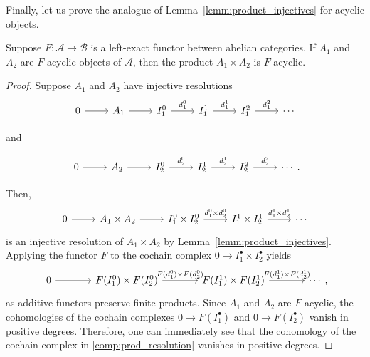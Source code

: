 Finally, let us prove the analogue of Lemma~\ref{lemm:product_injectives}
for acyclic objects.
\begin{lemm}\label{lemm:acyclic_prod}
  Suppose $F:\mathcal{A}\to\mathcal{B}$ is a left-exact functor between
  abelian categories. If $A_{1}$ and $A_{2}$ are $F$-acyclic objects of
  $\mathcal{A}$, then the product $A_{1}\times A_{2}$ is $F$-acyclic.
\end{lemm}
\begin{proof}
  Suppose $A_{1}$ and $A_{2}$ have injective resolutions
  \[\begin{tikzcd}
    0\rar & A_1\rar & I_1^0\rar{d_1^0} & I_1^1\rar{d_1^1} &
    I_1^2\rar{d_1^2} & \cdots
  \end{tikzcd}\]
  \begin{center}
    and
  \end{center}
  \[\begin{tikzcd}
    0\rar & A_2\rar & I_2^0\rar{d_2^0} & I_2^1\rar{d_2^1}
    & I_2^2\rar{d_2^2} & \cdots
  \end{tikzcd}.\]

  Then,
  \[\begin{tikzcd}
      0\rar & A_{1}\times A_{2}\rar & I_{1}^{0}\times I_{2}^{0}
      \rar{d_{1}^{0}\times d_{2}^{0}} & I_{1}^{1}\times I_{2}^{1}
      \rar{d_{1}^{1}\times d_{2}^{1}} & \cdots
    \end{tikzcd}\]
  is an injective resolution of $A_{1}\times A_{2}$ by
  Lemma~\ref{lemm:product_injectives}. Applying the functor $F$ to the
  cochain complex $0\to I_{1}^{\bullet}\times I_{2}^{\bullet}$ yields
  \begin{equation}\label{comp:prod_resolution}
    \begin{tikzcd}[column sep=large]
      0\rar & F(I_{1}^{0})\times F(I_{2}^{0})
      \rar{F(d_{1}^{0})\times F(d_{2}^{0})} & F(I_{1}^{1})\times F(I_{2}^{1})
      \rar{F(d_{1}^{1})\times F(d_{2}^{1})} & \cdots
    \end{tikzcd},
  \end{equation}
  as additive functors preserve finite products. Since $A_{1}$ and $A_{2}$
  are $F$-acyclic, the cohomologies of the cochain complexes $0\to F\left(I_{1}^{\bullet}\right)$
  and $0\to F\left(I_{2}^{\bullet}\right)$ vanish in positive degrees.
  Therefore, one can immediately see that the cohomology of the cochain complex in
  \eqref{comp:prod_resolution} vanishes in positive degrees.
\end{proof}

